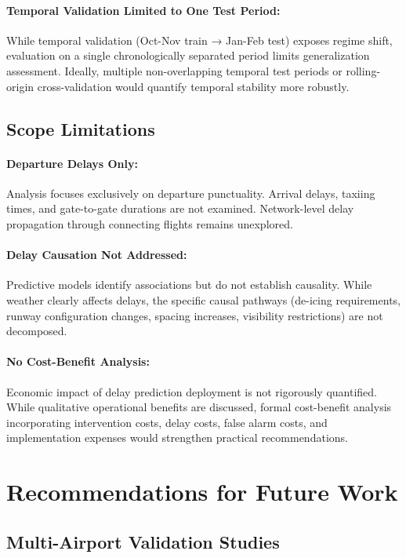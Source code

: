 \documentclass{report}
\begin{document}
\paragraph{Temporal Validation Limited to One Test Period:} While temporal validation (Oct-Nov train → Jan-Feb test) exposes regime shift, evaluation on a single chronologically separated period limits generalization assessment. Ideally, multiple non-overlapping temporal test periods or rolling-origin cross-validation would quantify temporal stability more robustly.

\subsection{Scope Limitations}

\paragraph{Departure Delays Only:} Analysis focuses exclusively on departure punctuality. Arrival delays, taxiing times, and gate-to-gate durations are not examined. Network-level delay propagation through connecting flights remains unexplored.

\paragraph{Delay Causation Not Addressed:} Predictive models identify associations but do not establish causality. While weather clearly affects delays, the specific causal pathways (de-icing requirements, runway configuration changes, spacing increases, visibility restrictions) are not decomposed.

\paragraph{No Cost-Benefit Analysis:} Economic impact of delay prediction deployment is not rigorously quantified. While qualitative operational benefits are discussed, formal cost-benefit analysis incorporating intervention costs, delay costs, false alarm costs, and implementation expenses would strengthen practical recommendations.

\section{Recommendations for Future Work}
\label{sec:future_work}

\subsection{Multi-Airport Validation Studies}
\end{document}
